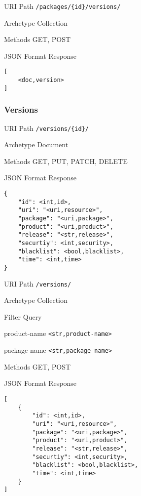 \documentclass[10pt,a4paper]{scrartcl}
\begin{document}
\begin{mdframed}[style=def]
\begin{description*}
	\item[URI Path] \texttt{/packages/\{id\}/versions/}
	\item[Archetype] Collection
	\item[Methods] GET, POST
	\item[JSON Format Response] \hfill
\begin{lstlisting}
[
	<doc,version>
]
\end{lstlisting}
\end{description*}
\end{mdframed}


\pagebreak
\subsubsection{Versions}

\begin{mdframed}[style=def]
\begin{description*}
	\item[URI Path] \texttt{/versions/\{id\}/}
	\item[Archetype] Document
	\item[Methods] GET, PUT, PATCH, DELETE
	\item[JSON Format Response] \hfill
\begin{lstlisting}
{
	"id": <int,id>,
	"uri": "<uri,resource>",
	"package": "<uri,package>",
	"product": "<uri,product>",
	"release": "<str,release>",
	"securtiy": <int,security>,
	"blacklist": <bool,blacklist>,
	"time": <int,time>
}
\end{lstlisting}
\end{description*}
\end{mdframed}

\begin{mdframed}[style=def]
\begin{description*}
	\item[URI Path] \texttt{/versions/}
	\item[Archetype] Collection
	\item[Filter Query] \hfill
	\begin{description*}
		\item[product-name] \texttt{<str,product-name>}
		\item[package-name] \texttt{<str,package-name>}
	\end{description*}
	\item[Methods] GET, POST
	\item[JSON Format Response] \hfill
\begin{lstlisting}
[
	{
		"id": <int,id>,
		"uri": "<uri,resource>",
		"package": "<uri,package>",
		"product": "<uri,product>",
		"release": "<str,release>",
		"securtiy": <int,security>,
		"blacklist": <bool,blacklist>,
		"time": <int,time>
	}
]
\end{lstlisting}
\end{description*}
\end{mdframed}
\end{document}
